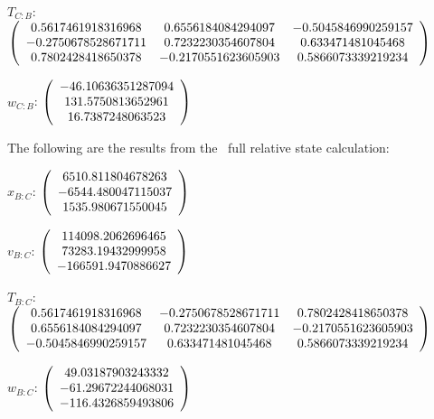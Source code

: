 \begin{description}
$T_{C:B}$: $\left( \begin{array} {ccc}
 0.5617461918316968 &    0.6556184084294097 &   -0.5045846990259157 \\
  -0.2750678528671711 &    0.7232230354607804 &     0.633471481045468 \\
  0.7802428418650378 &   -0.2170551623605903 &    0.5866073339219234 \\
\end{array} \right)\\ \\$

$w_{C:B}$:  $\left( \begin{array} {ccc} -46.10636351287094 \\     131.5750813652961 \\      16.7387248063523
\end{array} \right)\\ \\$

The following are the results from the \ full relative state calculation:

$x_{B:C}$: $\left( \begin{array} {ccc} 6510.811804678263 \\    -6544.480047115037 \\     1535.980671550045
\end{array} \right)\\ \\$

$v_{B:C}$:  $\left( \begin{array} {ccc} 114098.2062696465 \\     73283.19432999958 \\    -166591.9470886627
\end{array} \right)\\ \\$

$T_{B:C}$: $\left( \begin{array} {ccc}
0.5617461918316968 &   -0.2750678528671711 &    0.7802428418650378 \\
0.6556184084294097 &    0.7232230354607804 &   -0.2170551623605903 \\
-0.5045846990259157 &     0.633471481045468 &    0.5866073339219234 \\
\end{array} \right)\\ \\$

$w_{B:C}$:  $\left( \begin{array} {ccc} 49.03187903243332 \\    -61.29672244068031 \\    -116.4326859493806
\end{array} \right)\\ \\$


\end{description}
